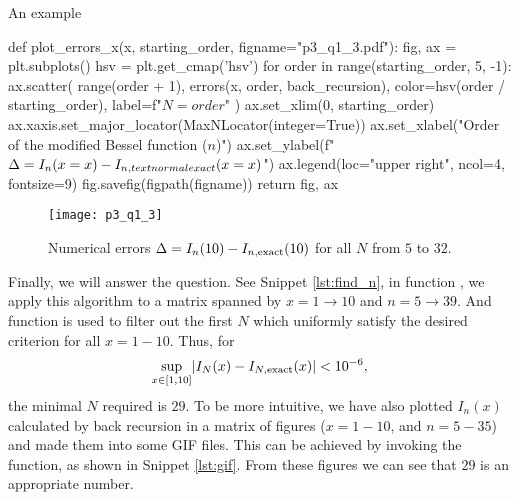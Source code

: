 \begin{algorithm}
    \caption{An example}
    \label{lst:plot_errors_x}
    \begin{pythoncode}
        def plot_errors_x(x, starting_order, figname="p3_q1_3.pdf"):
            fig, ax = plt.subplots()
            hsv = plt.get_cmap('hsv')
            for order in range(starting_order, 5, -1):
                ax.scatter(
                    range(order + 1), errors(x, order, back_recursion),
                    color=hsv(order / starting_order),
                    label=f"$N={order}$"
                )
            ax.set_xlim(0, starting_order)
            ax.xaxis.set_major_locator(MaxNLocator(integer=True))
            ax.set_xlabel("Order of the modified Bessel function ($n$)")
            ax.set_ylabel(f"$\Delta = I_{{n}}(x={x}) - I_{{n,\\textnormal{{exact}}}}(x={x})$")
            ax.legend(loc="upper right", ncol=4, fontsize=9)
            fig.savefig(figpath(figname))
            return fig, ax
        \end{pythoncode}
\end{algorithm}

\begin{figure}
    \centering
    \texttt{[image: p3\_q1\_3]}
    \caption{Numerical errors $\Delta = I_n(10) - I_{n,\textnormal{exact}}(10)$
        for all $N$ from $5$ to $32$.}
    \label{fig:plot_errors_10}
\end{figure}

Finally, we will answer the question. See Snippet \ref{lst:find_n},
in function , we apply this algorithm to a matrix spanned by
$x = 1 \to 10$ and $n = 5 \to 39$.
And function  is used to filter out the first $N$ which uniformly
satisfy the desired criterion for all $x = 1 - 10$.
Thus, for
%
\begin{equation}
    \sup_{x \in [1, 10]} \lvert I_N(x) - I_{N,\textnormal{exact}}(x) \rvert < 10^{-6},
\end{equation}
%
the minimal $N$ required is $29$.
To be more intuitive, we have also plotted $I_n(x)$ calculated by back recursion
in a matrix of figures ($x = 1 - 10$, and $n = 5 - 35$) and made them into some GIF files.
This can be achieved by invoking the  function, as shown in
Snippet \ref{lst:gif}. From these figures we can see that $29$ is an appropriate number.

